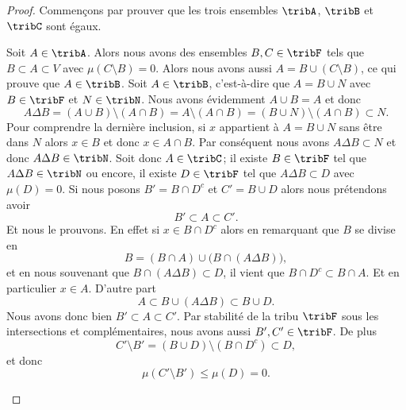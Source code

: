\begin{proof}
	Commençons par prouver que les trois ensembles \( \tribA\), \( \tribB\) et \( \tribC\) sont égaux.
	\begin{subproof}
		Soit \( A\in\tribA\). Alors nous avons des ensembles \( B,C\in\tribF \) tels que \( B\subset A\subset V\) avec \( \mu(C\setminus B)=0\). Alors nous avons aussi \( A=B\cup(C\setminus B)\), ce qui prouve que \( A\in\tribB\).
		Soit \( A\in\tribB\), c'est-à-dire que \( A=B\cup N\) avec \( B\in\tribF\) et \( N\in\tribN\). Nous avons évidemment \( A\cup B=A\) et donc
		\begin{equation}
			A\Delta B=(A\cup B)\setminus(A\cap B)=A\setminus(A\cap B)=(B\cup N)\setminus(A\cap B)\subset N.
		\end{equation}
		Pour comprendre la dernière inclusion, si \( x\) appartient à \( A=B\cup N\) sans être dans \( N\) alors \( x\in B\) et donc \( x\in A\cap B\). Par conséquent nous avons \( A\Delta B\subset N\) et donc \( A\Delta B\in\tribN\).
		\spitem[\( \tribC\subset\tribA\)]
		Soit donc \( A\in\tribC\); il existe \( B\in\tribF\) tel que \( A\Delta B\in\tribN\) ou encore, il existe \( D\in\tribF\) tel que \( A\Delta B\subset D\) avec \( \mu(D)=0\). Si nous posons \( B'=B\cap D^c\) et \( C'=B\cup D\) alors nous prétendons avoir
		\begin{equation}
			B'\subset A\subset C'.
		\end{equation}
		Et nous le prouvons. En effet si \( x\in B\cap D^c\) alors en remarquant que \( B\) se divise en
		\begin{equation}
			B=(B\cap A)\cup\big(B\cap (A\Delta B)\big),
		\end{equation}
		et en nous souvenant que \( B\cap (A\Delta B)\subset D\), il vient que \( B\cap D^c\subset B\cap A\). Et en particulier \( x\in A\). D'autre part
		\begin{equation}
			A\subset B\cup(A\Delta B)\subset B\cup D.
		\end{equation}
		Nous avons donc bien \( B'\subset A\subset C'\). Par stabilité de la tribu \( \tribF\) sous les intersections et complémentaires, nous avons aussi \( B',C'\in\tribF\). De plus
		\begin{equation}
			C'\setminus B'=(B\cup D)\setminus(B\cap D^c)\subset D,
		\end{equation}
		et donc
		\begin{equation}
			\mu(C'\setminus B')\leq \mu(D)=0.
		\end{equation}
	\end{subproof}


\end{proof}
